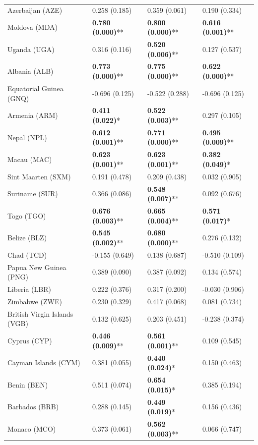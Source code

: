 \begin{longtable}{p{4cm}p{3cm}p{3cm}p{3cm}}
Azerbaijan (AZE) & 0.258 (0.185) & 0.359 (0.061) & 0.190 (0.334) \\
Moldova (MDA) & \textbf{0.780 (0.000)}** & \textbf{0.800 (0.000)}** & \textbf{0.616 (0.001)}** \\
Uganda (UGA) & 0.316 (0.116) & \textbf{0.520 (0.006)}** & 0.127 (0.537) \\
Albania (ALB) & \textbf{0.773 (0.000)}** & \textbf{0.775 (0.000)}** & \textbf{0.622 (0.000)}** \\
Equatorial Guinea (GNQ) & -0.696 (0.125) & -0.522 (0.288) & -0.696 (0.125) \\
Armenia (ARM) & \textbf{0.411 (0.022)}* & \textbf{0.522 (0.003)}** & 0.297 (0.105) \\
Nepal (NPL) & \textbf{0.612 (0.001)}** & \textbf{0.771 (0.000)}** & \textbf{0.495 (0.009)}** \\
Macau (MAC) & \textbf{0.623 (0.001)}** & \textbf{0.623 (0.001)}** & \textbf{0.382 (0.049)}* \\
Sint Maarten (SXM) & 0.191 (0.478) & 0.209 (0.438) & 0.032 (0.905) \\
Suriname (SUR) & 0.366 (0.086) & \textbf{0.548 (0.007)}** & 0.092 (0.676) \\
Togo (TGO) & \textbf{0.676 (0.003)}** & \textbf{0.665 (0.004)}** & \textbf{0.571 (0.017)}* \\
Belize (BLZ) & \textbf{0.545 (0.002)}** & \textbf{0.680 (0.000)}** & 0.276 (0.132) \\
Chad (TCD) & -0.155 (0.649) & 0.138 (0.687) & -0.510 (0.109) \\
Papua New Guinea (PNG) & 0.389 (0.090) & 0.387 (0.092) & 0.134 (0.574) \\
Liberia (LBR) & 0.222 (0.376) & 0.317 (0.200) & -0.030 (0.906) \\
Zimbabwe (ZWE) & 0.230 (0.329) & 0.417 (0.068) & 0.081 (0.734) \\
British Virgin Islands (VGB) & 0.132 (0.625) & 0.203 (0.451) & -0.238 (0.374) \\
Cyprus (CYP) & \textbf{0.446 (0.009)}** & \textbf{0.561 (0.001)}** & 0.109 (0.545) \\
Cayman Islands (CYM) & 0.381 (0.055) & \textbf{0.440 (0.024)}* & 0.150 (0.463) \\
Benin (BEN) & 0.511 (0.074) & \textbf{0.654 (0.015)}* & 0.385 (0.194) \\
Barbados (BRB) & 0.288 (0.145) & \textbf{0.449 (0.019)}* & 0.156 (0.436) \\
Monaco (MCO) & 0.373 (0.061) & \textbf{0.562 (0.003)}** & 0.066 (0.747) \\

\end{longtable}
